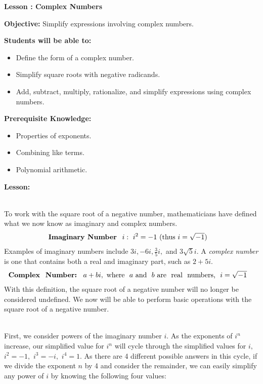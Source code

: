 \documentclass[12pt]{article}
\theoremstyle{definition}
\begin{document}
{\bf \large Lesson : Complex Numbers}\label{les:i_and_complex_numbers}
\hfill \doclicenseImage[imagewidth=5em]\\
\par
{\bf Objective:} Simplify expressions involving complex numbers.\\
\par
{\bf Students will be able to:}
\begin{itemize}
	\item Define the form of a complex number.
	\item Simplify square roots with negative radicands.
	\item Add, subtract, multiply, rationalize, and simplify expressions using complex numbers.
\end{itemize}
{\bf Prerequisite Knowledge:}
\begin{itemize}
	\item Properties of exponents.
	\item Combining like terms.
	\item Polynomial arithmetic.
\end{itemize}
\hrulefill

{\bf Lesson:}\\
\ \par
To work with the square root of a negative number, mathematicians have defined what we now know as imaginary and complex numbers.
\begin{eqnarray*}
  \text{{\bf Imaginary\ Number \ }} i:~ i^2
  = - 1~ (\text{thus\ } i = \sqrt{- 1}) &  & 
\end{eqnarray*}
Examples of imaginary numbers include $3 i, - 6 i, \frac{3}{5} i,$ and $3 \sqrt{5}i$. A {\it complex number} is one that contains both a real and imaginary part, such as $2 + 5 i$.
\begin{eqnarray*}
  \text{{\bf Complex \ Number: \ }} a+bi, \text{\ where \ } a \text{\ and \ } b \text{\ are \ real \ numbers, \ } i = \sqrt{- 1} &  & 
\end{eqnarray*}
With this definition, the square root of a negative number will no longer be considered undefined. We now will be able to perform basic operations with the square root of a negative number.\\
\ \par
First, we consider powers of the imaginary number $i$.
As the exponents of $i^n$ increase, our simplified value for $i^n$ will cycle through the simplified values for $i,$ $i^2=- 1,$ $i^3= - i,$ $i^4=1$. As there are 4 different possible answers in this
cycle, if we divide the exponent $n$ by 4 and consider the remainder, we can easily simplify any power of $i$ by knowing the following four values:
\end{document}
